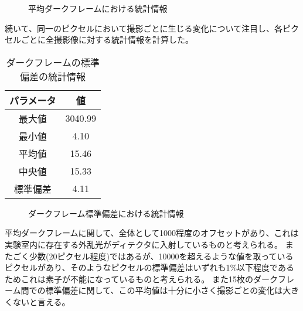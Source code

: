 \begin{figure}[!ht]
\centering


\caption[]{平均ダークフレームにおける統計情報}
\label{fig:darkflame_average_stat}
\end{figure}

続いて、同一のピクセルにおいて撮影ごとに生じる変化について注目し、各ピクセルごとに全撮影像に対する統計情報を計算した。

\begin{table}[!ht]
\begin{center}
  \caption{ダークフレームの標準偏差の統計情報}
  \begin{tabular}{|c|c|} \hline
    パラメータ & 値 \\ \hline
    最大値 & 3040.99 \\
    最小値 & 4.10 \\
    平均値 & 15.46 \\
    中央値 & 15.33 \\
    標準偏差 & 4.11 \\ \hline
  \end{tabular}
  \label{tb:darkflame_deviation_data}
\end{center}
\end{table}

\begin{figure}[!ht]
\centering


\caption[]{ダークフレーム標準偏差における統計情報}
\label{fig:darkflame_deviation_stat}
\end{figure}

平均ダークフレームに関して、全体として1000程度のオフセットがあり、これは実験室内に存在する外乱光がディテクタに入射しているものと考えられる。
またごく少数(20ピクセル程度)ではあるが、10000を超えるような値を取っているピクセルがあり、そのようなピクセルの標準偏差はいずれも1\%以下程度であるためこれは素子が不能になっているものと考えられる。
また15枚のダークフレーム間での標準偏差に関して、この平均値は十分に小さく撮影ごとの変化は大きくないと言える。

